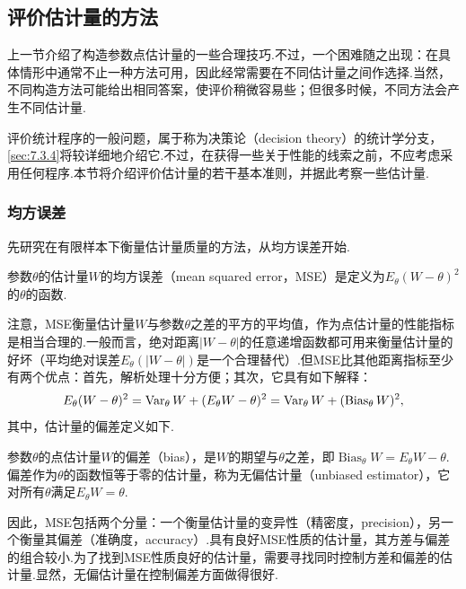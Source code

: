 \subsection{评价估计量的方法}\label{sec:7.3}
上一节介绍了构造参数点估计量的一些合理技巧.不过，一个困难随之出现：在具体情形中通常不止一种方法可用，因此经常需要在不同估计量之间作选择.当然，不同构造方法可能给出相同答案，使评价稍微容易些；但很多时候，不同方法会产生不同估计量.

评价统计程序的一般问题，属于称为决策论（decision theory）的统计学分支，\autoref{sec:7.3.4}将较详细地介绍它.不过，在获得一些关于性能的线索之前，不应考虑采用任何程序.本节将介绍评价估计量的若干基本准则，并据此考察一些估计量.
\subsubsection{均方误差}\label{sec:7.3.1}
先研究在有限样本下衡量估计量质量的方法，从均方误差开始.
\begin{definition}\label{def:7.3.1}
参数$\theta$的估计量$W$的均方误差（mean squared error，MSE）是定义为$E_\theta(W-\theta)^2$的$\theta$的函数.
\end{definition}
注意，MSE衡量估计量$W$与参数$\theta$之差的平方的平均值，作为点估计量的性能指标是相当合理的.一般而言，绝对距离$|W-\theta|$的任意递增函数都可用来衡量估计量的好坏（平均绝对误差$E_\theta(|W-\theta|)$是一个合理替代）.但MSE比其他距离指标至少有两个优点：首先，解析处理十分方便；其次，它具有如下解释：
\begin{equation}\label{eq:7.3.1}\index{SI0801@方差}
E_\theta(W-\theta)^2=\operatorname{Var}_\theta W+(E_\theta W-\theta)^2=\operatorname{Var}_\theta W+(\operatorname{Bias}_\theta W)^2,
\end{equation}
其中，估计量的偏差定义如下.
\begin{definition}\label{def:7.3.2}
参数$\theta$的点估计量$W$的偏差（bias），是$W$的期望与$\theta$之差，即$\operatorname{Bias}_\theta W=E_\theta W-\theta$.偏差作为$\theta$的函数恒等于零的估计量，称为无偏估计量（unbiased estimator），它对所有$\theta$满足$E_\theta W=\theta$.
\end{definition}
因此，MSE包括两个分量：一个衡量估计量的变异性（精密度，precision），另一个衡量其偏差（准确度，accuracy）.具有良好MSE性质的估计量，其方差与偏差的组合较小.为了找到MSE性质良好的估计量，需要寻找同时控制方差和偏差的估计量.显然，无偏估计量在控制偏差方面做得很好.

